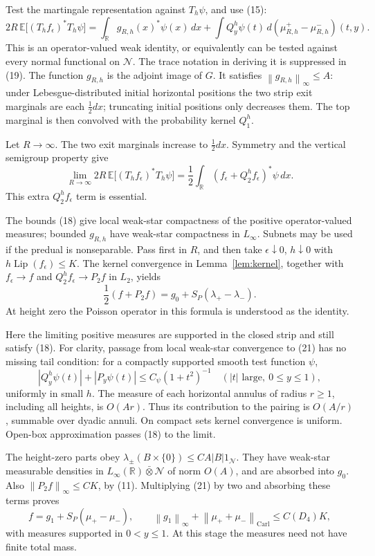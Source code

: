 \documentclass[11pt]{article}
\newcommand{\N}{\mathcal N}
\newcommand{\E}{\mathbb E}
\newcommand{\Carl}{\mathrm{Carl}}
\newcommand{\R}{\mathbb R}
\newcommand{\norm}[1]{\left\|#1\right\|}
\begin{document}
Test the martingale representation against \(T_h\psi\), and use (15):
\[
 2R\,\E\bigl[(T_h f_\epsilon)^*T_h\psi\bigr]
 =\int_\R g_{R,h}(x)^*\psi(x)\,dx
   +\int Q^h_y\psi(t)\,d(\mu_{R,h}^+-\mu_{R,h}^-)(t,y).       \tag{19}
\]
This is an operator-valued weak identity, or equivalently can be tested
against every normal functional on \(\N\). The trace notation in
deriving it is suppressed in (19).
The function \(g_{R,h}\) is the adjoint image of \(G\).
It satisfies \(\norm{g_{R,h}}_\infty\le A\):
under Lebesgue-distributed initial horizontal positions the two strip
exit marginals are each \(\frac12 dx\); truncating initial positions
only decreases them. The top marginal is then convolved with the
probability kernel \(Q^h_1\).

Let \(R\to\infty\). The two exit marginals increase to
\(\frac12 dx\). Symmetry and the vertical semigroup property give
\[
 \lim_{R\to\infty}2R\,\E\bigl[(T_h f_\epsilon)^*T_h\psi\bigr]
 =\frac12\int_\R(f_\epsilon+Q^h_2f_\epsilon)^*\psi\,dx.       \tag{20}
\]
This extra \(Q^h_2f_\epsilon\) term is essential.

The bounds (18) give local weak-star compactness of the positive
operator-valued measures; bounded \(g_{R,h}\) have weak-star compactness
in \(L_\infty\). Subnets may be used if the predual is nonseparable.
Pass first in \(R\), and then take \(\epsilon\downarrow0\), \(h\downarrow0\)
with \(h\operatorname{Lip}(f_\epsilon)\le K\).
The kernel convergence in Lemma~\ref{lem:kernel}, together with
\(f_\epsilon\to f\) and \(Q^h_2f_\epsilon\to P_2f\) in \(L_2\), yields
\[
 \frac12(f+P_2f)=g_0+S_P(\lambda_+-\lambda_-).              \tag{21}
\]
At height zero the Poisson operator in this formula is understood
as the identity.

Here the limiting positive measures are supported in the closed strip
and still satisfy (18). For clarity, passage from local weak-star
convergence to (21) has no missing tail condition: for a compactly
supported smooth test function \(\psi\),
\[
 |Q^h_y\psi(t)|+|P_y\psi(t)|
 \le C_\psi(1+t^2)^{-1}\quad (|t|\text{ large},\ 0\le y\le1),
\]
uniformly in small \(h\). The measure of each horizontal annulus
of radius \(r\ge1\), including all heights, is \(O(Ar)\).
Thus its contribution to the pairing is \(O(A/r)\), summable over
dyadic annuli. On compact sets kernel convergence is uniform.
Open-box approximation passes (18) to the limit.

The height-zero parts obey
\(\lambda_\pm(B\times\{0\})\le C A|B|1_\N\).
They have weak-star measurable densities in
\(L_\infty(\R)\bar\otimes\N\) of norm \(O(A)\), and are absorbed into
\(g_0\). Also \(\norm{P_2f}_\infty\le C K\), by (11).
Multiplying (21) by two and absorbing these terms proves
\[
 f=g_1+S_P(\mu_+-\mu_-),\qquad
 \norm{g_1}_\infty+\norm{\mu_++\mu_-}_{\Carl}\le C(D_4)K,    \tag{22}
\]
with measures supported in \(0<y\le1\). At this stage the measures need
not have finite total mass.
\end{document}
